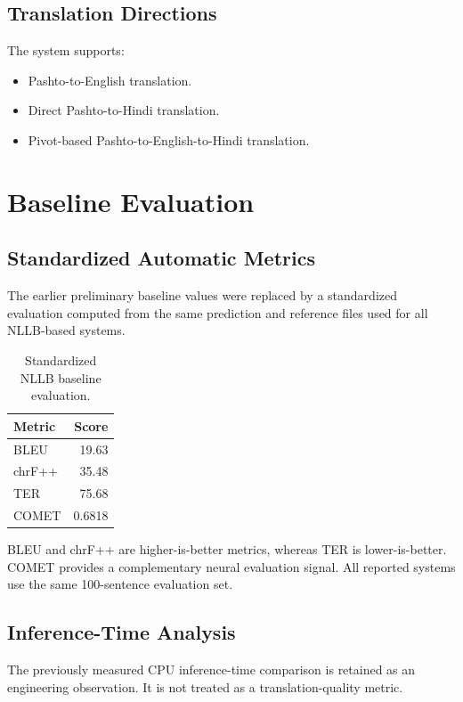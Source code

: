 \documentclass[conference]{IEEEtran}
\begin{document}
\subsection{Translation Directions}

The system supports:

\begin{itemize}
    \item Pashto-to-English translation.
    \item Direct Pashto-to-Hindi translation.
    \item Pivot-based Pashto-to-English-to-Hindi translation.
\end{itemize}

\section{Baseline Evaluation}

\subsection{Standardized Automatic Metrics}

The earlier preliminary baseline values were replaced by a
standardized evaluation computed from the same prediction
and reference files used for all NLLB-based systems.

\begin{table}[H]
\centering
\caption{Standardized NLLB baseline evaluation.}
\label{tab:standardized-baseline}
\begin{tabular}{lr}
\toprule
\textbf{Metric} & \textbf{Score} \\
\midrule
BLEU & 19.63 \\
chrF++ & 35.48 \\
TER & 75.68 \\
COMET & 0.6818 \\
\bottomrule
\end{tabular}
\end{table}

BLEU and chrF++ are higher-is-better metrics, whereas TER
is lower-is-better. COMET provides a complementary neural
evaluation signal. All reported systems use the same
100-sentence evaluation set.

\subsection{Inference-Time Analysis}

The previously measured CPU inference-time comparison is
retained as an engineering observation. It is not treated as
a translation-quality metric.
\end{document}
